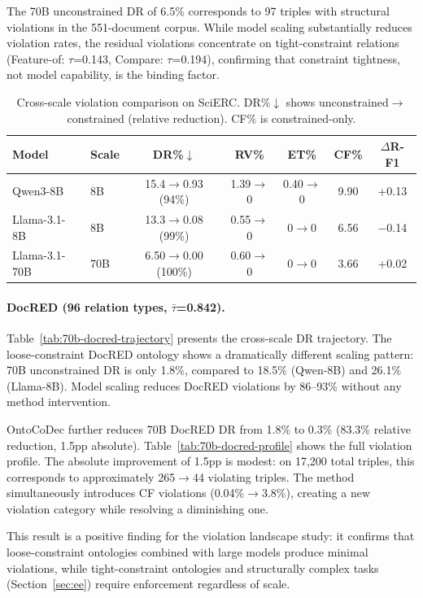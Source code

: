 \documentclass[11pt,a4paper]{article}
\begin{document}
The 70B unconstrained DR of 6.5\% corresponds to 97 triples with structural violations in the 551-document corpus. While model scaling substantially reduces violation rates, the residual violations concentrate on tight-constraint relations (Feature-of: $\tau$=0.143, Compare: $\tau$=0.194), confirming that constraint tightness, not model capability, is the binding factor.

\begin{table}[t]
\centering
\caption{Cross-scale violation comparison on SciERC. DR\%$\downarrow$ shows unconstrained$\to$constrained (relative reduction). CF\% is constrained-only.}
\label{tab:70b-scierc}
\small
\begin{tabular}{llccccc}
\toprule
Model & Scale & DR\%$\downarrow$ & RV\% & ET\% & CF\% & $\Delta$R-F1 \\
\midrule
Qwen3-8B & 8B & 15.4$\to$0.93 (94\%) & 1.39$\to$0 & 0.40$\to$0 & 9.90 & +0.13 \\
Llama-3.1-8B & 8B & 13.3$\to$0.08 (99\%) & 0.55$\to$0 & 0$\to$0 & 6.56 & $-$0.14 \\
Llama-3.1-70B & 70B & 6.50$\to$0.00 (100\%) & 0.60$\to$0 & 0$\to$0 & 3.66 & +0.02 \\
\bottomrule
\end{tabular}
\end{table}

\paragraph{DocRED (96 relation types, $\bar{\tau}$=0.842).}
Table~\ref{tab:70b-docred-trajectory} presents the cross-scale DR trajectory. The loose-constraint DocRED ontology shows a dramatically different scaling pattern: 70B unconstrained DR is only 1.8\%, compared to 18.5\% (Qwen-8B) and 26.1\% (Llama-8B). Model scaling reduces DocRED violations by 86--93\% without any method intervention.

OntoCoDec further reduces 70B DocRED DR from 1.8\% to 0.3\% (83.3\% relative reduction, 1.5pp absolute). Table~\ref{tab:70b-docred-profile} shows the full violation profile. The absolute improvement of 1.5pp is modest: on 17,200 total triples, this corresponds to approximately 265$\to$44 violating triples. The method simultaneously introduces CF violations (0.04\%$\to$3.8\%), creating a new violation category while resolving a diminishing one.

This result is a positive finding for the violation landscape study: it confirms that loose-constraint ontologies combined with large models produce minimal violations, while tight-constraint ontologies and structurally complex tasks (Section~\ref{sec:ee}) require enforcement regardless of scale.
\end{document}

